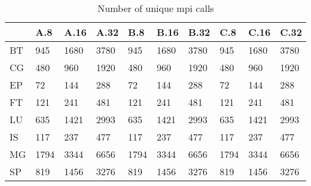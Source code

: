 \begin{table}[]
\centering
\label{tb:unique_mpi_calls}
\caption{Number of unique mpi calls}
\begin{tabular}{@{}llllllllll@{}}
\toprule
 & A.8 & A.16 & A.32 & B.8  & B.16 & B.32 & C.8  & C.16 & C.32 \\ \midrule
BT & 945 & 1680 & 3780 & 945  & 1680 & 3780 & 945  & 1680 & 3780 \\
CG & 480 & 960  & 1920 & 480  & 960  & 1920 & 480  & 960  & 1920 \\
EP & 72  & 144  & 288  & 72   & 144  & 288  & 72   & 144  & 288  \\ 
FT & 121 & 241  & 481  & 121  & 241  & 481  & 121  & 241  & 481  \\
LU & 635 & 1421 & 2993 & 635  & 1421 & 2993 & 635  & 1421 & 2993 \\
IS & 117 & 237  & 477  & 117  & 237  & 477  & 117  & 237  & 477  \\
MG & 1794 & 3344 & 6656 & 1794 & 3344 & 6656 & 1794 & 3344 & 6656 \\
SP & 819  & 1456 & 3276 & 819  & 1456 & 3276 & 819  & 1456 & 3276 \\ \bottomrule
\end{tabular}
\end{table}
